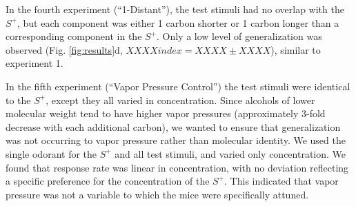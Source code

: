 In the fourth experiment (``1-Distant''), the test stimuli had no overlap with the $S^+$, but each component was either 1 carbon shorter or 1 carbon longer than a corresponding component in the $S^+$.  Only a low level of generalization was observed (Fig. \ref{fig:results}d, $XXXX index = XXXX \pm XXXX$), similar to experiment 1.  

In the fifth experiment (``Vapor Pressure Control'') the test stimuli were identical to the $S^+$, except they all varied in concentration.  Since alcohols of lower molecular weight tend to have higher vapor pressures (approximately 3-fold decrease with each additional carbon), we wanted to ensure that generalization was not occurring to vapor pressure rather than molecular identity.  We used the single odorant for the $S^+$ and all test stimuli, and varied only concentration.  We found that response rate was linear in concentration, with no deviation reflecting a specific preference for the concentration of the $S^+$.  This indicated that vapor pressure was not a variable to which the mice were specifically attuned.  